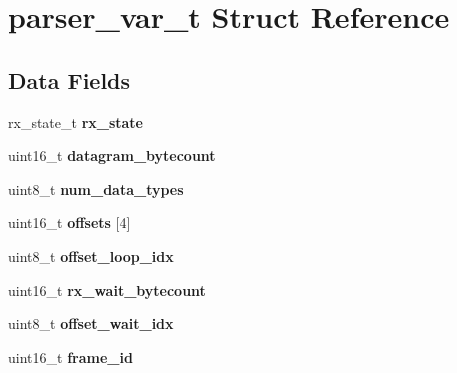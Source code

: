 \hypertarget{structparser__var__t}{}\section{parser\+\_\+var\+\_\+t Struct Reference}
\label{structparser__var__t}
\subsection*{Data Fields}
\begin{DoxyCompactItemize}
\item 
\mbox{\label{structparser__var__t_aaa58b57d8eae02a80455ab75fb540423}} 
rx\+\_\+state\+\_\+t {\bfseries rx\+\_\+state}
\item 
\mbox{\label{structparser__var__t_a54ea3ec01f8166255d8caf8365ab70d8}} 
uint16\+\_\+t {\bfseries datagram\+\_\+bytecount}
\item 
\mbox{\label{structparser__var__t_a883bea3ba932d1eff0b0d7b1950c3dee}} 
uint8\+\_\+t {\bfseries num\+\_\+data\+\_\+types}
\item 
\mbox{\label{structparser__var__t_aa90ac5e2aeae2c80d72ad35cdb06849e}} 
uint16\+\_\+t {\bfseries offsets} \mbox{[}4\mbox{]}
\item 
\mbox{\label{structparser__var__t_ac85fdb6c123d6a3d8cfc12387b73d28b}} 
uint8\+\_\+t {\bfseries offset\+\_\+loop\+\_\+idx}
\item 
\mbox{\label{structparser__var__t_a1932f31a613c5b65f9be6ad970d9fcbc}} 
uint16\+\_\+t {\bfseries rx\+\_\+wait\+\_\+bytecount}
\item 
\mbox{\label{structparser__var__t_a79baf5586f5cc330803eb6d2bd2c6b25}} 
uint8\+\_\+t {\bfseries offset\+\_\+wait\+\_\+idx}
\item 
\mbox{\label{structparser__var__t_a135aa2aef2d738778acdebf0aff931b1}} 
uint16\+\_\+t {\bfseries frame\+\_\+id}
\item 
\mbox{\label{structparser__var__t_a1f4a0b81c336ec7bf8aa3d0bae0dd191}} 

\end{DoxyCompactItemize}
